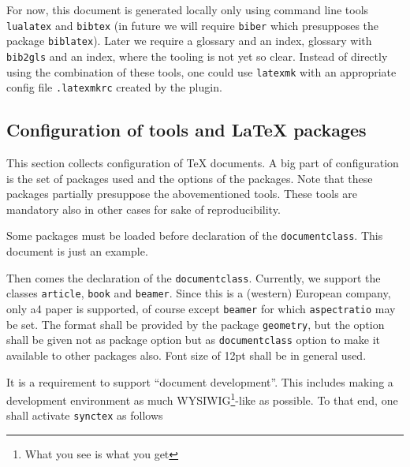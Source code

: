 \documentclass[a4paper,12pt]{article}
\begin{document}
For now, this document is generated locally 
only using command line tools \texttt{lualatex} and \texttt{bibtex} 
(in future we will require \texttt{biber} which presupposes the package \texttt{biblatex}). 
Later we require a glossary and an index, glossary with \texttt{bib2gls} 
and an index, where the tooling is not yet so clear. 
Instead of directly using the combination of these tools, 
one could use \texttt{latexmk} 
with an appropriate config file \texttt{.latexmkrc} created by the plugin. 

\subsection{Configuration of tools and \LaTeX{} packages}\label{subsec:toolConf}

This section collects configuration of \TeX{} documents. 
A big part of configuration is the set of packages used 
and the options of the packages. 
Note that these packages partially presuppose the abovementioned tools. 
These tools are mandatory also in other cases for sake of reproducibility. 

Some packages must be loaded before declaration of the \texttt{documentclass}. 
This document is just an example. 


Then comes the declaration of the \texttt{documentclass}. 
Currently, we support the classes \texttt{article}, \texttt{book} and \texttt{beamer}. 
Since this is a (western) European company, only a4 paper is supported, 
of course except \texttt{beamer} for which \texttt{aspectratio} may be set. 
The format shall be provided by the package \texttt{geometry}, 
but the option shall be given not as package option but as \texttt{documentclass} option 
to make it available to other packages also. 
Font size of 12pt shall be in general used. 


It is a requirement to support ``document development''. 
This includes making a development environment as much 
WYSIWIG\footnote{What you see is what you get}-like as possible. 
To that end, one shall activate \texttt{synctex} as follows 

\end{document}
